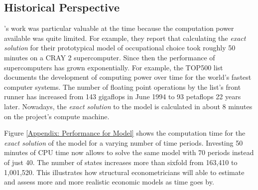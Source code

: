 \subsection{Historical Perspective}\label{Appendix: Historical Perspective}
\citet{Keane.1994}'s work was particular valuable at the time because the computation power available was quite limited. For example, they report that calculating the \textit{exact solution} for their prototypical model of occupational choice took roughly 50 minutes on a CRAY 2 supercomputer. Since then the performance of supercomputers has grown exponentially. For example, the TOP500 \citep{TOP500.2017} list documents the development of computing power over time for the world's fastest computer systems. The number of floating point operations by the list's front runner has increased from 143 gigaflops in June 1994 to 93 petaflops 22 years later. Nowadays, the \textit{exact solution} to the model is calculated in about 8 minutes on the project's compute machine.
%

%
Figure \ref{Appendix: Performance for Model} shows the computation time for the \textit{exact solution} of the model for a varying number of time periods. Investing 50 minutes of CPU time now allows to solve the same model with 70 periods instead of just 40. The number of states increases more than sixfold from 163,410 to 1,001,520. This illustrates how structural econometricians will able to estimate and assess more and more realistic economic models as time goes by.
